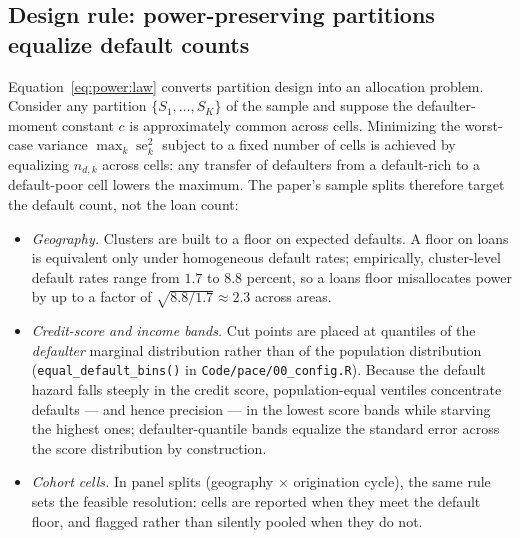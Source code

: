 \subsection{Design rule: power-preserving partitions equalize default counts}

Equation~\eqref{eq:power:law} converts partition design into an allocation problem. Consider any partition $\{S_1, \dots, S_K\}$ of the sample and suppose the defaulter-moment constant $c$ is approximately common across cells. Minimizing the worst-case variance $\max_k \operatorname{se}^2_k$ subject to a fixed number of cells is achieved by equalizing $n_{d,k}$ across cells: any transfer of defaulters from a default-rich to a default-poor cell lowers the maximum. The paper's sample splits therefore target the default count, not the loan count:

\begin{itemize}
\item \emph{Geography.} Clusters are built to a floor on expected defaults. A floor on loans is equivalent only under homogeneous default rates; empirically, cluster-level default rates range from $1.7$ to $8.8$ percent, so a loans floor misallocates power by up to a factor of $\sqrt{8.8/1.7} \approx 2.3$ across areas.
\item \emph{Credit-score and income bands.} Cut points are placed at quantiles of the \emph{defaulter} marginal distribution rather than of the population distribution (\texttt{equal\_default\_bins()} in \texttt{Code/pace/00\_config.R}). Because the default hazard falls steeply in the credit score, population-equal ventiles concentrate defaults --- and hence precision --- in the lowest score bands while starving the highest ones; defaulter-quantile bands equalize the standard error across the score distribution by construction.
\item \emph{Cohort cells.} In panel splits (geography $\times$ origination cycle), the same rule sets the feasible resolution: cells are reported when they meet the default floor, and flagged rather than silently pooled when they do not.
\end{itemize}
